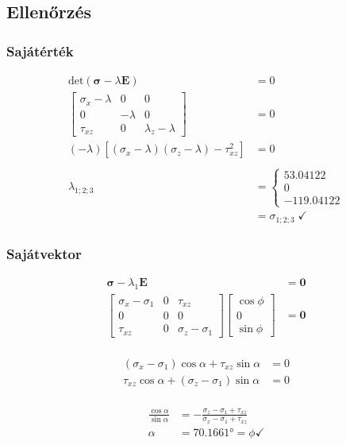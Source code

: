\subsection{Ellenőrzés}

\subsubsection{Sajátérték}
\begin{align*}
	\text{det}(\pmb{\sigma} - \lambda\pmb{E}) &= 0 \\
	\begin{bmatrix}
		\sigma_x - \lambda & 0 & 0 \\
		0 & -\lambda & 0 \\
		\tau_{xz} & 0 & \lambda_z - \lambda
	\end{bmatrix} &= 0 \\
	(-\lambda)\left[(\sigma_x - \lambda)(\sigma_z - \lambda) - \tau_{xz}^2\right] &= 0 \\ \\
	\lambda_{1;2;3} &= \begin{cases}
		53.04122 \\
		0 \\
		-119.04122
	\end{cases} \\&= \sigma_{1;2;3} \; \checkmark
\end{align*}

\subsubsection{Sajátvektor}
\begin{align*}
	\pmb{\sigma} - \lambda_1 \pmb{E} &= \pmb{0} \\
	\begin{bmatrix}
		\sigma_x - \sigma_1 & 0 & \tau_{xz} \\
		0 & 0 & 0 \\
		\tau_{xz} & 0 & \sigma_z - \sigma_1 
	\end{bmatrix} \begin{bmatrix}
		\cos \phi \\
		0 \\
		\sin \phi
	\end{bmatrix} &= \pmb{0} \\
\end{align*}

\begin{align*}
	(\sigma_x - \sigma_1)\cos \alpha + \tau_{xz} \sin \alpha &= 0 \\
	 \tau_{xz} \cos \alpha + (\sigma_z - \sigma_1)\sin \alpha &= 0 \\
\end{align*}

\begin{align*}
	 \frac{\cos \alpha}{\sin \alpha} &= -\frac{\sigma_z - \sigma_1 + \tau_{xz}}{\sigma_x - \sigma_1 + \tau_{xz}} \\
	 \alpha &= \ang{70.1661} = \phi \checkmark
\end{align*}

